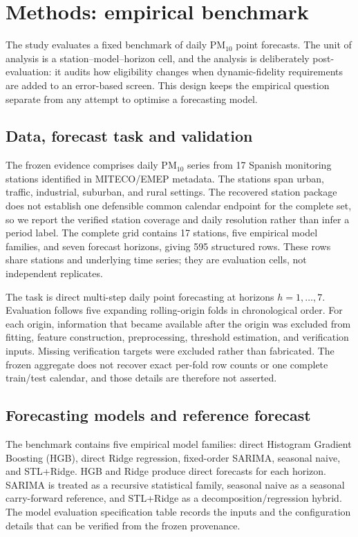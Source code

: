 \section{Methods: empirical benchmark}
\label{sec:casestudy}

The study evaluates a fixed benchmark of daily PM$_{10}$ point forecasts.
The unit of analysis is a station--model--horizon cell, and the analysis
is deliberately post-evaluation: it audits how eligibility changes when
dynamic-fidelity requirements are added to an error-based screen. This
design keeps the empirical question separate from any attempt to optimise
a forecasting model.

\subsection{Data, forecast task and validation}

The frozen evidence comprises daily PM$_{10}$ series from 17 Spanish
monitoring stations identified in MITECO/EMEP metadata. The stations span
urban, traffic, industrial, suburban, and rural settings. The recovered
station package does not establish one defensible common calendar endpoint
for the complete set, so we report the verified station coverage and daily
resolution rather than infer a period label. The complete grid contains
17 stations, five empirical model families, and seven forecast horizons,
giving 595 structured rows. These rows share stations and underlying time
series; they are evaluation cells, not independent replicates.

The task is direct multi-step daily point forecasting at horizons
$h=1,\ldots,7$. Evaluation follows five expanding rolling-origin folds in
chronological order. For each origin, information that became available
after the origin was excluded from fitting, feature construction,
preprocessing, threshold estimation, and verification inputs. Missing
verification targets were excluded rather than fabricated. The frozen
aggregate does not recover exact per-fold row counts or one complete
train/test calendar, and those details are therefore not asserted.

\subsection{Forecasting models and reference forecast}

The benchmark contains five empirical model families: direct Histogram
Gradient Boosting (HGB), direct Ridge regression, fixed-order SARIMA,
seasonal naive, and STL+Ridge. HGB and Ridge produce direct forecasts for
each horizon. SARIMA is treated as a recursive statistical family,
seasonal naive as a seasonal carry-forward reference, and STL+Ridge as a
decomposition/regression hybrid. The model evaluation specification table
records the inputs and the
configuration details that can be verified from the frozen provenance.

